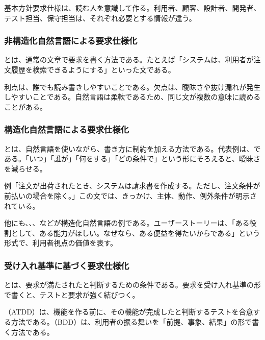 \documentclass[a4paper,11pt]{ltjsarticle}
\numberwithin{figure}{section}
\numberwithin{table}{section}
\newcommand{\MiniBox}[2]{\par\smallskip\begin{statementbox}{#1}#2\end{statementbox}\par\smallskip}
\begin{document}
\MiniBox{基本方針}{要求仕様は、読む人を意識して作る。利用者、顧客、設計者、開発者、テスト担当、保守担当は、それぞれ必要とする情報が違う。}

\subsubsection{非構造化自然言語による要求仕様化}

とは、通常の文章で要求を書く方法である。たとえば「システムは、利用者が注文履歴を検索できるようにする」といった文である。

利点は、誰でも読み書きしやすいことである。欠点は、曖昧さや抜け漏れが発生しやすいことである。自然言語は柔軟であるため、同じ文が複数の意味に読めることがある。

\subsubsection{構造化自然言語による要求仕様化}

とは、自然言語を使いながら、書き方に制約を加える方法である。代表例は、である。「いつ」「誰が」「何をする」「どの条件で」という形にそろえると、曖昧さを減らせる。

\MiniBox{例}{「注文が出荷されたとき、システムは請求書を作成する。ただし、注文条件が前払いの場合を除く。」この文では、きっかけ、主体、動作、例外条件が明示されている。}

他にも、、、などが構造化自然言語の例である。ユーザーストーリーは、「ある役割として、ある能力がほしい。なぜなら、ある便益を得たいからである」という形式で、利用者視点の価値を表す。

\subsubsection{受け入れ基準に基づく要求仕様化}

とは、要求が満たされたと判断するための条件である。要求を受け入れ基準の形で書くと、テストと要求が強く結びつく。

（ATDD）は、機能を作る前に、その機能が完成したと判断するテストを合意する方法である。（BDD）は、利用者の振る舞いを「前提、事象、結果」の形で書く方法である。
\end{document}
